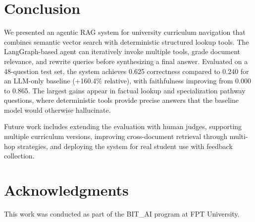 \documentclass[lettersize,journal]{IEEEtran}
\begin{document}
\section{Conclusion}

We presented an agentic RAG system for university curriculum navigation that combines semantic vector search with deterministic structured lookup tools. The LangGraph-based agent can iteratively invoke multiple tools, grade document relevance, and rewrite queries before synthesizing a final answer. Evaluated on a 48-question test set, the system achieves 0.625 correctness compared to 0.240 for an LLM-only baseline (+160.4\% relative), with faithfulness improving from 0.000 to 0.865. The largest gains appear in factual lookup and specialization pathway questions, where deterministic tools provide precise answers that the baseline model would otherwise hallucinate.

Future work includes extending the evaluation with human judges, supporting multiple curriculum versions, improving cross-document retrieval through multi-hop strategies, and deploying the system for real student use with feedback collection.

\section*{Acknowledgments}
This work was conducted as part of the BIT\_AI program at FPT University.
\end{document}
